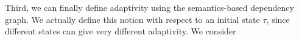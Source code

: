 %
Third, we can finally define adaptivity using the semantics-based dependency graph. We actually define this notion with respect to an initial state $\tau$, since different states can give very different adaptivity.  
We consider 
